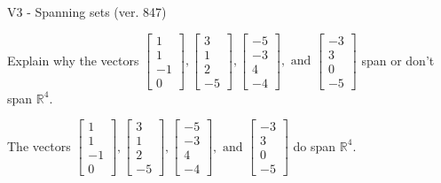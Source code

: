 \begin{exercise}
  \begin{exerciseTitle}V3 - Spanning sets (ver. 847)\end{exerciseTitle}
  \begin{exerciseStatement}
    Explain why the vectors \(\left[\begin{array}{r}
1 \\
1 \\
-1 \\
0
\end{array}\right] , \left[\begin{array}{r}
3 \\
1 \\
2 \\
-5
\end{array}\right] , \left[\begin{array}{r}
-5 \\
-3 \\
4 \\
-4
\end{array}\right] , \text{ and } \left[\begin{array}{r}
-3 \\
3 \\
0 \\
-5
\end{array}\right]\) span or don't span \(\mathbb{R}^4\). 
	


  \end{exerciseStatement}
  \begin{exerciseAnswer}
   The vectors \(\left[\begin{array}{r}
1 \\
1 \\
-1 \\
0
\end{array}\right] , \left[\begin{array}{r}
3 \\
1 \\
2 \\
-5
\end{array}\right] , \left[\begin{array}{r}
-5 \\
-3 \\
4 \\
-4
\end{array}\right] , \text{ and } \left[\begin{array}{r}
-3 \\
3 \\
0 \\
-5
\end{array}\right]\) 
  	 do  
	span \(\mathbb{R}^4\).
  


  \end{exerciseAnswer}
\end{exercise}